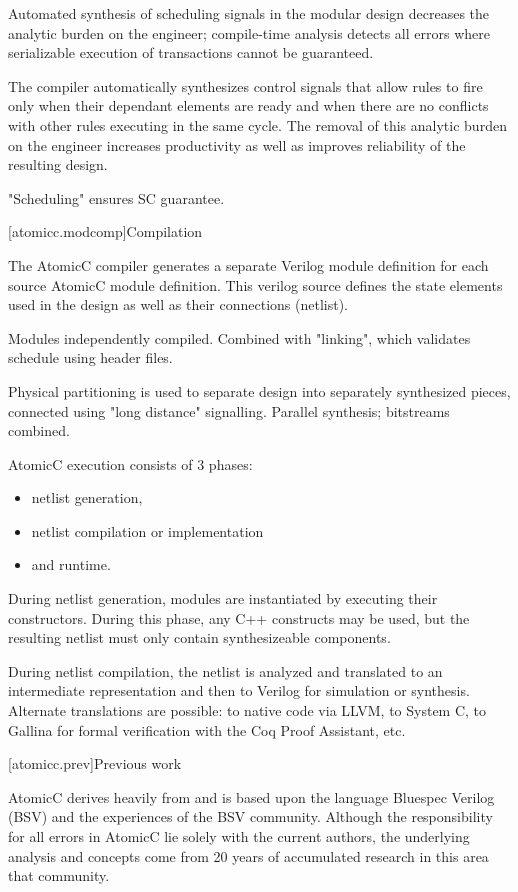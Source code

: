 Automated synthesis of scheduling signals in the modular design
decreases the analytic burden on the engineer; compile-time analysis
detects all errors where serializable execution of transactions cannot be guaranteed.

The compiler automatically synthesizes control signals that allow rules to fire
only when their dependant elements are ready and when there are no conflicts with
other rules executing in the same cycle.  The removal of this analytic burden on
the engineer increases productivity as well as improves reliability of the
resulting design.

"Scheduling" ensures SC guarantee.

[atomicc.modcomp]{Compilation}

The AtomicC compiler generates a separate Verilog module definition
for each source AtomicC module definition.
This verilog source defines the state elements
used in the design as well as their connections (netlist).

Modules independently compiled.  Combined with "linking", which validates schedule using header files.

Physical partitioning is used to separate design into separately synthesized pieces, connected using
"long distance" signalling.  Parallel synthesis; bitstreams combined.

AtomicC execution consists of 3 phases:
\begin{itemize}
\item netlist generation, 
\item netlist compilation or implementation
\item and runtime.
\end{itemize}

During netlist
generation, modules are instantiated by executing their
constructors. During this phase, any C++ constructs may be used, but
the resulting netlist must only contain synthesizeable components.

During netlist compilation, the netlist is analyzed and translated to
an intermediate representation and then to Verilog for simulation or
synthesis. Alternate translations are possible: to native code via
LLVM, to System C, to Gallina for formal verification with the Coq
Proof Assistant, etc.

[atomicc.prev]{Previous work}

AtomicC derives heavily from and is based upon the language Bluespec Verilog (BSV)
and the experiences of the BSV community.  Although the responsibility for all
errors in AtomicC lie solely with the current authors, the underlying analysis and
concepts come from 20 years of accumulated research in this area that community.

